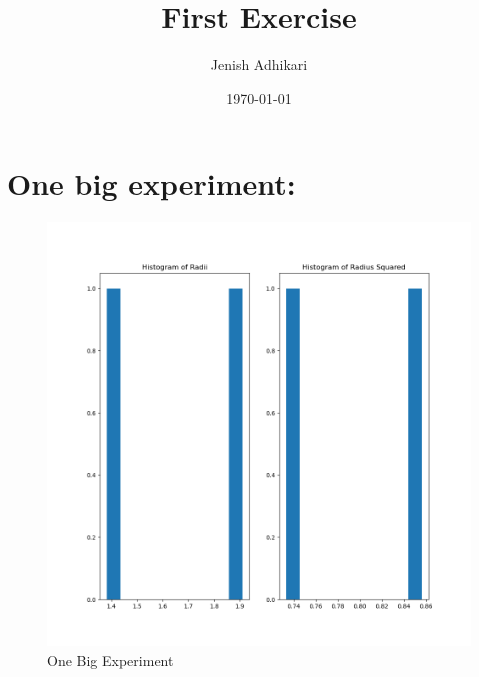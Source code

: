 \documentclass[titlepage]{scrartcl}
\title{First Exercise}
\author{Jenish Adhikari}
\date{\today}
\begin{document}
\maketitle
\tableofcontents
\clearpage
\newpage
{}

\section{One big experiment:}

\begin{figure}[htp]
    \centering
    \includegraphics[width=\textwidth]{One_Big_Experiment.png}
    \caption[OBE]{One Big Experiment}
\end{figure}
\end{document}
